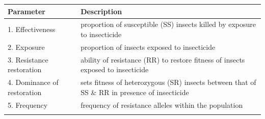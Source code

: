 \documentclass[11pt,]{article}
\begin{document}
\begin{longtable}[]{@{}ll@{}}
\toprule
\begin{minipage}[b]{0.28\columnwidth}\raggedright\strut
Parameter\strut
\end{minipage} & \begin{minipage}[b]{0.66\columnwidth}\raggedright\strut
Description\strut
\end{minipage}\tabularnewline
\midrule
\endhead
\begin{minipage}[t]{0.28\columnwidth}\raggedright\strut
1. Effectiveness\strut
\end{minipage} & \begin{minipage}[t]{0.66\columnwidth}\raggedright\strut
proportion of susceptible (SS) insects killed by exposure to
insecticide\strut
\end{minipage}\tabularnewline
\begin{minipage}[t]{0.28\columnwidth}\raggedright\strut
2. Exposure\strut
\end{minipage} & \begin{minipage}[t]{0.66\columnwidth}\raggedright\strut
proportion of insects exposed to insecticide\strut
\end{minipage}\tabularnewline
\begin{minipage}[t]{0.28\columnwidth}\raggedright\strut
3. Resistance restoration\strut
\end{minipage} & \begin{minipage}[t]{0.66\columnwidth}\raggedright\strut
ability of resistance (RR) to restore fitness of insects exposed to
insecticide\strut
\end{minipage}\tabularnewline
\begin{minipage}[t]{0.28\columnwidth}\raggedright\strut
4. Dominance of restoration\strut
\end{minipage} & \begin{minipage}[t]{0.66\columnwidth}\raggedright\strut
sets fitness of heterozygous (SR) insects between that of SS \& RR in
presence of insecticide\strut
\end{minipage}\tabularnewline
\begin{minipage}[t]{0.28\columnwidth}\raggedright\strut
5. Frequency\strut
\end{minipage} & \begin{minipage}[t]{0.66\columnwidth}\raggedright\strut
frequency of resistance alleles within the population\strut
\end{minipage}\tabularnewline
\begin{minipage}[t]{0.28\columnwidth}\raggedright\strut

\end{minipage}
\end{longtable}
\end{document}
